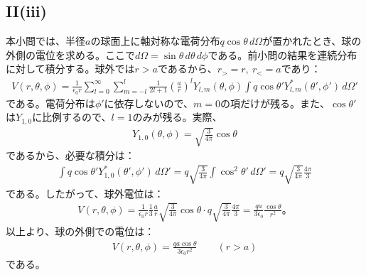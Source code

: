 \documentclass[platex,dvipdfmx,a4paper]{jsarticle}
\newcommand{\ssum}[3]{\sum_{#1=#2}^#3}
\begin{document}
  \subsection*{II(iii)}
  本小問では、半径$a$の球面上に軸対称な電荷分布$q\cos\theta\,d\Omega$が置かれたとき、球の外側の電位を求める。ここで$d\Omega=\sin\theta\,d\theta\,d\phi$である。前小問の結果を連続分布に対して積分する。球外では$r>a$であるから、$r_>=r,\ r_<=a$であり：
  \begin{align*}
    V(r,\theta,\phi)=\frac{1}{\epsilon_0 r}\ssum{l}{0}{\infty}\ssum{m}{-l}{l}\frac{1}{2l+1}\left(\frac{a}{r}\right)^lY_{l,m}(\theta,\phi)\int q\cos\theta'Y_{l,m}^*(\theta',\phi')\,d\Omega'
  \end{align*}
  である。電荷分布は$\phi'$に依存しないので、$m=0$の項だけが残る。また、$\cos\theta'$は$Y_{1,0}$に比例するので、$l=1$のみが残る。実際、
  \begin{align*}
    Y_{1,0}(\theta,\phi)=\sqrt{\frac{3}{4\pi}}\cos\theta
  \end{align*}
  であるから、必要な積分は：
  \begin{align*}
    \int q\cos\theta'Y_{1,0}^*(\theta',\phi')\,d\Omega'=q\sqrt{\frac{3}{4\pi}}\int\cos^2\theta'\,d\Omega'=q\sqrt{\frac{3}{4\pi}}\frac{4\pi}{3}
  \end{align*}
  である。したがって、球外電位は：
  \begin{align*}
    V(r,\theta,\phi)=\frac{1}{\epsilon_0 r}\frac{1}{3}\frac{a}{r}\sqrt{\frac{3}{4\pi}}\cos\theta\cdot q\sqrt{\frac{3}{4\pi}}\frac{4\pi}{3}=\frac{qa}{3\epsilon_0}\frac{\cos\theta}{r^2}。
  \end{align*}
  以上より、球の外側での電位は：
  \begin{align*}
    V(r,\theta,\phi)=\frac{qa\cos\theta}{3\epsilon_0 r^2}\qquad (r>a)
  \end{align*}
  である。
  
\end{document}
